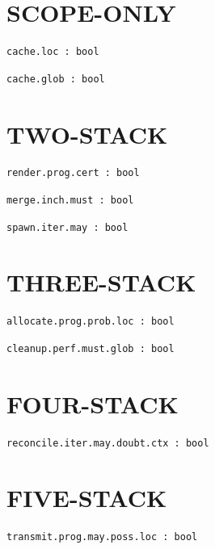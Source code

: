 \documentclass[11pt]{article}
\begin{document}
\section{SCOPE-ONLY}\label{sec:scope-only}
\begin{lstlisting}[language=csl]
cache.loc : bool
\end{lstlisting}
\begin{lstlisting}[language=csl]
cache.glob : bool
\end{lstlisting}
\section{TWO-STACK}\label{sec:two-stack}
\begin{lstlisting}[language=csl]
render.prog.cert : bool
\end{lstlisting}
\begin{lstlisting}[language=csl]
merge.inch.must : bool
\end{lstlisting}
\begin{lstlisting}[language=csl]
spawn.iter.may : bool
\end{lstlisting}
\section{THREE-STACK}\label{sec:three-stack}
\begin{lstlisting}[language=csl]
allocate.prog.prob.loc : bool
\end{lstlisting}
\begin{lstlisting}[language=csl]
cleanup.perf.must.glob : bool
\end{lstlisting}
\section{FOUR-STACK}\label{sec:four-stack}
\begin{lstlisting}[language=csl]
reconcile.iter.may.doubt.ctx : bool
\end{lstlisting}
\section{FIVE-STACK}\label{sec:five-stack}
\begin{lstlisting}[language=csl]
transmit.prog.may.poss.loc : bool
\end{lstlisting}
\end{document}
